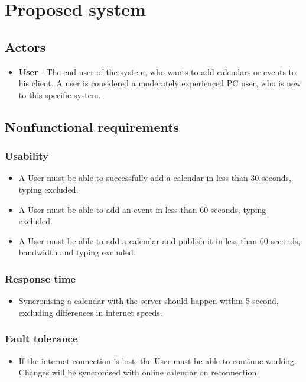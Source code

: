 \documentclass[10pt]{report}
\numberwithin{equation}{section} %
\numberwithin{figure}{section} %
\numberwithin{table}{section} %
\begin{document}
\section{Proposed system}
\subsection{Actors}
\begin{itemize}
\item \textbf{User} - The end user of the system, who wants to add calendars or
  events to his client. A user is considered a moderately experienced PC user,
  who is new to this specific system.
\end{itemize}

\subsection{Nonfunctional requirements}
\subsubsection{Usability}
\begin{itemize}
\item A User must be able to successfully add a calendar in less than 30
  seconds, typing excluded.
\item A User must be able to add an event in less than 60 seconds, typing
  excluded.
\item A User must be able to add a calendar and publish it in less than 60
  seconds, bandwidth and typing excluded.
\end{itemize}
\subsubsection{Response time}
\begin{itemize}
\item Syncronising a calendar with the server should happen within 5 second,
  excluding differences in internet speeds.
\end{itemize}
\subsubsection{Fault tolerance}
\begin{itemize}
\item If the internet connection is lost, the User must be able to continue
  working. Changes will be syncronised with online calendar on reconnection.
\end{itemize}
\end{document}

